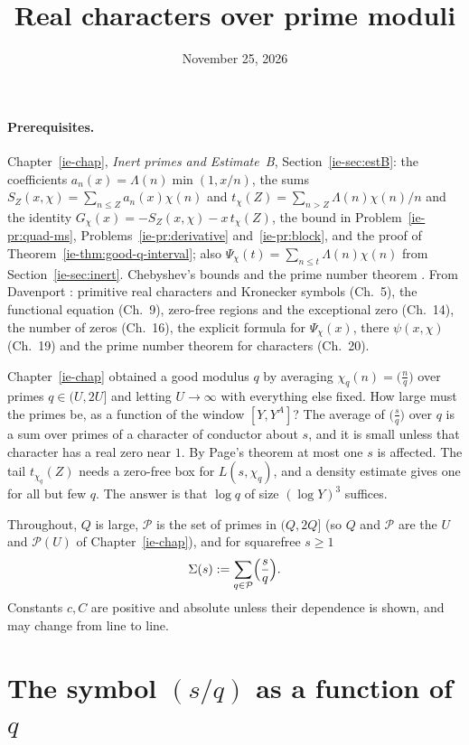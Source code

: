 \documentclass[reqno]{amsart}
\title{Real characters over prime moduli}
\author{}
\date{November 25, 2026}
\newcounter{chap}
\theoremstyle{definition}
\theoremstyle{plain}
\newcommand{\Pc}{\mathcal{P}}
\newcommand{\leg}[2]{\Bigl(\frac{#1}{#2}\Bigr)}
\begin{document}
\maketitle
{}\label{chap}

\paragraph{Prerequisites.}
Chapter~\ref{ie-chap}, \emph{Inert primes and Estimate~B}, Section~\ref{ie-sec:estB}: the coefficients $a_n(x) = \Lambda(n)\min(1, x/n)$, the sums $S_Z(x, \chi) = \sum_{n \le Z} a_n(x)\chi(n)$ and $t_\chi(Z) = \sum_{n > Z} \Lambda(n)\chi(n)/n$ and the identity $G_\chi(x) = -S_Z(x, \chi) - x\, t_\chi(Z)$, the bound in Problem~\ref{ie-pr:quad-ms}, Problems~\ref{ie-pr:derivative} and~\ref{ie-pr:block}, and the proof of Theorem~\ref{ie-thm:good-q-interval}; also $\Psi_\chi(t) = \sum_{n \le t} \Lambda(n)\chi(n)$ from Section~\ref{ie-sec:inert}.  Chebyshev's bounds and the prime number theorem \cite[Ch.~18]{Dav}.  From Davenport \cite{Dav}: primitive real characters and Kronecker symbols (Ch.~5), the functional equation (Ch.~9), zero-free regions and the exceptional zero (Ch.~14), the number of zeros (Ch.~16), the explicit formula for $\Psi_\chi(x)$, there $\psi(x, \chi)$ (Ch.~19) and the prime number theorem for characters (Ch.~20). %

\medskip
Chapter~\ref{ie-chap} obtained a good modulus $q$ by averaging $\chi_q(n) = \bigl(\frac nq\bigr)$ over primes $q \in (U, 2U]$ and letting $U \to \infty$ with everything else fixed.  How large must the primes be, as a function of the window $[Y, Y^A]$?  The average of $\bigl(\frac sq\bigr)$ over $q$ is a sum over primes of a character of conductor about $s$, and it is small unless that character has a real zero near $1$.  By Page's theorem at most one $s$ is affected.  The tail $t_{\chi_q}(Z)$ needs a zero-free box for $L(s, \chi_q)$, and a density estimate gives one for all but few $q$.  The answer is that $\log q$ of size $(\log Y)^3$ suffices.

Throughout, $Q$ is large, $\Pc$ is the set of primes in $(Q, 2Q]$ (so $Q$ and $\Pc$ are the $U$ and $\mathcal P(U)$ of Chapter~\ref{ie-chap}), and for squarefree $s \ge 1$
\[
  \Sigma(s) := \sum_{q \in \Pc} \leg{s}{q} .
\]
Constants $c, C$ are positive and absolute unless their dependence is shown, and may change from line to line.

\section{The symbol \texorpdfstring{$(s/q)$}{(s/q)} as a function of \texorpdfstring{$q$}{q}}\label{sec:symbol}
\end{document}
